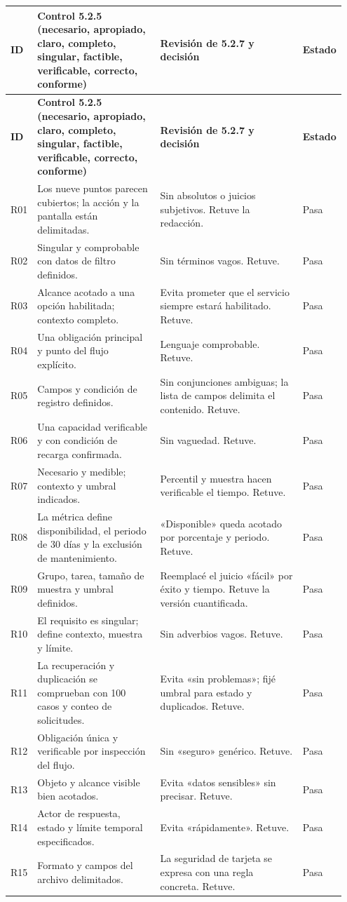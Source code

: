\documentclass[10pt,letterpaper]{article}
\begin{document}
\scriptsize
\begin{longtable}{@{}p{0.06\linewidth}p{0.37\linewidth}p{0.43\linewidth}p{0.09\linewidth}@{}}
\toprule\rowcolor{azulclaro}\textbf{ID}&\textbf{Control 5.2.5 (necesario, apropiado, claro, completo, singular, factible, verificable, correcto, conforme)}&\textbf{Revisión de 5.2.7 y decisión}&\textbf{Estado}\\\midrule\endfirsthead
\toprule\rowcolor{azulclaro}\textbf{ID}&\textbf{Control 5.2.5 (necesario, apropiado, claro, completo, singular, factible, verificable, correcto, conforme)}&\textbf{Revisión de 5.2.7 y decisión}&\textbf{Estado}\\\midrule\endhead
R01&Los nueve puntos parecen cubiertos; la acción y la pantalla están delimitadas.&Sin absolutos o juicios subjetivos. Retuve la redacción.&Pasa\\
R02&Singular y comprobable con datos de filtro definidos.&Sin términos vagos. Retuve.&Pasa\\
R03&Alcance acotado a una opción habilitada; contexto completo.&Evita prometer que el servicio siempre estará habilitado. Retuve.&Pasa\\
R04&Una obligación principal y punto del flujo explícito.&Lenguaje comprobable. Retuve.&Pasa\\
R05&Campos y condición de registro definidos.&Sin conjunciones ambiguas; la lista de campos delimita el contenido. Retuve.&Pasa\\
R06&Una capacidad verificable y con condición de recarga confirmada.&Sin vaguedad. Retuve.&Pasa\\
R07&Necesario y medible; contexto y umbral indicados.&Percentil y muestra hacen verificable el tiempo. Retuve.&Pasa\\
R08&La métrica define disponibilidad, el periodo de 30 días y la exclusión de mantenimiento.&«Disponible» queda acotado por porcentaje y periodo. Retuve.&Pasa\\
R09&Grupo, tarea, tamaño de muestra y umbral definidos.&Reemplacé el juicio «fácil» por éxito y tiempo. Retuve la versión cuantificada.&Pasa\\
R10&El requisito es singular; define contexto, muestra y límite.&Sin adverbios vagos. Retuve.&Pasa\\
R11&La recuperación y duplicación se comprueban con 100 casos y conteo de solicitudes.&Evita «sin problemas»; fijé umbral para estado y duplicados. Retuve.&Pasa\\
R12&Obligación única y verificable por inspección del flujo.&Sin «seguro» genérico. Retuve.&Pasa\\
R13&Objeto y alcance visible bien acotados.&Evita «datos sensibles» sin precisar. Retuve.&Pasa\\
R14&Actor de respuesta, estado y límite temporal especificados.&Evita «rápidamente». Retuve.&Pasa\\
R15&Formato y campos del archivo delimitados.&La seguridad de tarjeta se expresa con una regla concreta. Retuve.&Pasa\\
\bottomrule
\end{longtable}
\normalsize
\end{document}
